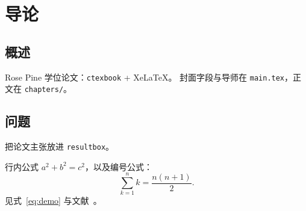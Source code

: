 \chapter{导论}
\label{ch:intro}

\section{概述}

Rose Pine 学位论文：\texttt{ctexbook} + XeLaTeX。
封面字段与导师在 \texttt{main.tex}，正文在 \texttt{chapters/}。

\section{问题}

\begin{resultbox}
把论文主张放进 \texttt{resultbox}。
\end{resultbox}

行内公式 $a^2 + b^2 = c^2$，以及编号公式：
\begin{equation}
  \label{eq:demo}
  \sum_{k=1}^{n} k = \frac{n(n+1)}{2}.
\end{equation}
见式~\eqref{eq:demo} 与文献~\cite{rosepine2026}。
